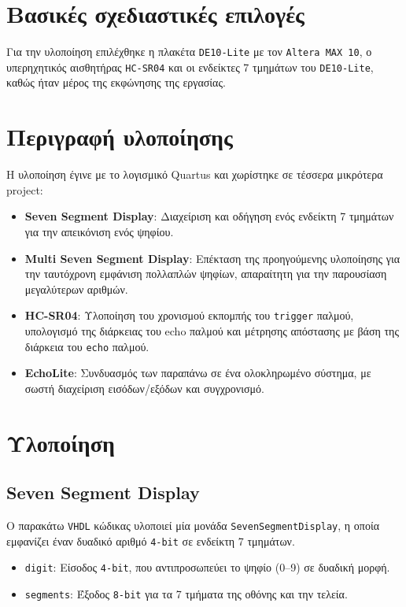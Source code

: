 \documentclass[conference]{IEEEtran}
\begin{document}
\section{Βασικές σχεδιαστικές επιλογές}
Για την υλοποίηση επιλέχθηκε η πλακέτα  \texttt{DE10-Lite}\cite{de10lite} με τον  \texttt{Altera MAX 10}\cite{de10litemanual}, ο υπερηχητικός αισθητήρας  \texttt{HC-SR04}\cite{hcsr04} και οι ενδείκτες 7 τμημάτων του  \texttt{DE10-Lite}\cite{de10litemanual}, καθώς ήταν μέρος της εκφώνησης της εργασίας.

\section{Περιγραφή υλοποίησης}
Η υλοποίηση έγινε με το λογισμικό Quartus\cite{quartus} και χωρίστηκε σε τέσσερα μικρότερα project:
\begin{itemize}
    \item \textbf{Seven Segment Display}: Διαχείριση και οδήγηση ενός ενδείκτη 7 τμημάτων για την απεικόνιση ενός ψηφίου.
    \item \textbf{Multi Seven Segment Display}: Επέκταση της προηγούμενης υλοποίησης για την ταυτόχρονη εμφάνιση πολλαπλών ψηφίων, απαραίτητη για την παρουσίαση μεγαλύτερων αριθμών.
    \item \textbf{HC-SR04}: Υλοποίηση του χρονισμού εκπομπής του \texttt{trigger} παλμού, υπολογισμό της διάρκειας του echo παλμού και μέτρησης απόστασης με βάση της διάρκεια του \texttt{echo} παλμού.
    \item \textbf{EchoLite}: Συνδυασμός των παραπάνω σε ένα ολοκληρωμένο σύστημα, με σωστή διαχείριση εισόδων/εξόδων και συγχρονισμό.
\end{itemize}

\section{Υλοποίηση}
\subsection{Seven Segment Display}
Ο παρακάτω \texttt{VHDL} κώδικας υλοποιεί μία μονάδα \texttt{SevenSegmentDisplay}, η οποία εμφανίζει έναν δυαδικό αριθμό \texttt{4-bit} σε ενδείκτη 7 τμημάτων.

\begin{itemize}
    \item \texttt{digit}: Είσοδος \texttt{4-bit}, που αντιπροσωπεύει το ψηφίο (0–9) σε δυαδική μορφή.
    \item \texttt{segments}: Έξοδος \texttt{8-bit} για τα 7 τμήματα της οθόνης και την τελεία.
\end{itemize}
\end{document}
